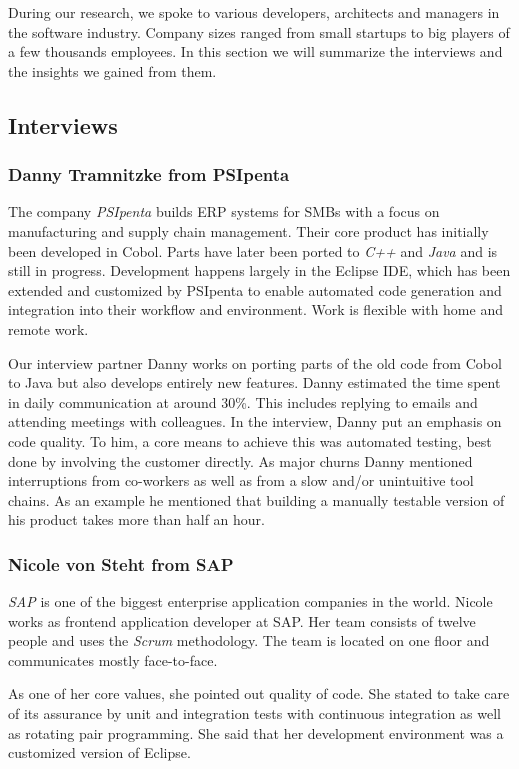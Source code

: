 During our research, we spoke to various developers, architects and managers in the software industry. Company sizes ranged from small startups to big players of a few thousands employees. In this section we will summarize the interviews and the insights we gained from them.

\subsection{Interviews}
\subsubsection{Danny Tramnitzke from PSIpenta}
The company \emph{PSIpenta} builds ERP systems for SMBs with a focus on manufacturing and supply chain management. Their core product has initially been developed in Cobol. Parts have later been ported to \emph{C++} and \emph{Java} and is still in progress. Development happens largely in the Eclipse IDE, which has been extended and customized by PSIpenta to enable automated code generation and integration into their workflow and environment. Work is flexible with home and remote work.

Our interview partner Danny works on porting parts of the old code from Cobol to Java but also develops entirely new features.
Danny estimated the time spent in daily communication at around 30\%. This includes replying to emails and attending meetings with colleagues.
In the interview, Danny put an emphasis on code quality. To him, a core means to achieve this was automated testing, best done by involving the customer directly.
As major churns Danny mentioned interruptions from co-workers as well as from a slow and/or unintuitive tool chains. As an example he mentioned that building a manually testable version of his product takes more than half an hour.

\subsubsection{Nicole von Steht from SAP}
\emph{SAP} is one of the biggest enterprise application companies in the world. Nicole works as frontend application developer at SAP. Her team consists of twelve people and uses the \emph{Scrum} methodology. The team is located on one floor and communicates mostly face-to-face.

As one of her core values, she pointed out quality of code. She stated to take care of its assurance by unit and integration tests with continuous integration as well as rotating pair programming. She said that her development environment was a customized version of Eclipse.

